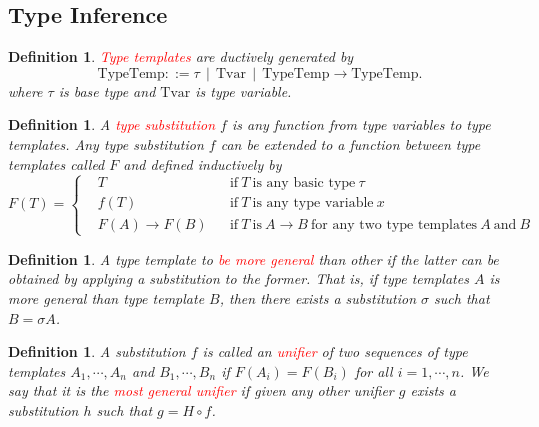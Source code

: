 \documentclass{article}
\theoremstyle{plain}
\newtheorem{definition}[theorem]{Definition}
\theoremstyle{nonumberplain}
\newcommand{\redt}[1]{\textcolor{red}{#1}}
\begin{document}
\newpage
\subsection{Type Inference}

\begin{definition}
\rm \cite{typinf}\redt{Type templates} are ductively generated by 
$$
\text{TypeTemp} ::= \tau ~~|~~ \text{Tvar} ~~|~~\text{TypeTemp} \to \text{TypeTemp}. 
$$
where $\tau$ is base type and $\text{Tvar}$ is type variable. 
\end{definition}



\begin{definition}
\rm A \redt{type substitution} $f$ is any function from type variables to type templates. Any type substitution $f$ can be extended to a function between type templates called $F$ and defined inductively by
$$
F(T) = \left\{
\begin{aligned}
	&T && \text{if}~T~\text{is any basic type}~\tau \\
	&f(T) &&  \text{if}~T~\text{is any type variable}~x \\
	&F(A) \to F(B) &&  \text{if}~T~\text{is}~A \to B~\text{for any two type templates}~A~\text{and}~B 
\end{aligned}
\right.
$$
\end{definition}

\begin{definition}
\rm A type template to \redt{be more general} than other if the latter can be obtained by applying a substitution to the former. That is, if type templates $A$ is more general than type template $B$, then there exists a substitution $\sigma$ such that $B = \sigma A$.
\end{definition}

\begin{definition}
\rm A substitution $f$ is called an \redt{unifier} of two sequences of type templates $A_1,\cdots,A_n$ and $B_1,\cdots,B_n$ if $F(A_i) = F(B_i)$ for all $i = 1,\cdots,n$. We say that it is the \redt{most general unifier} if given any other unifier $g$ exists a substitution $h$ such that $g = H \circ f$. 
\end{definition}
\end{document}
